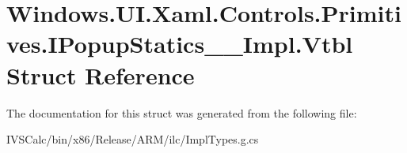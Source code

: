 \hypertarget{struct_windows_1_1_u_i_1_1_xaml_1_1_controls_1_1_primitives_1_1_i_popup_statics_____impl_1_1_vtbl}{}\section{Windows.\+U\+I.\+Xaml.\+Controls.\+Primitives.\+I\+Popup\+Statics\+\_\+\+\_\+\+Impl.\+Vtbl Struct Reference}
\label{struct_windows_1_1_u_i_1_1_xaml_1_1_controls_1_1_primitives_1_1_i_popup_statics_____impl_1_1_vtbl}


The documentation for this struct was generated from the following file\+:\begin{DoxyCompactItemize}
\item 
I\+V\+S\+Calc/bin/x86/\+Release/\+A\+R\+M/ilc/Impl\+Types.\+g.\+cs\end{DoxyCompactItemize}
